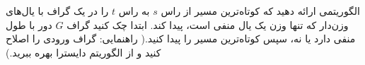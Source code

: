 الگوریتمی ارائه دهید که کوتاه‌ترین مسیر از راس $s$ به راس $t$ را در یک گراف با یال‌های وزن‌دار که تنها وزن یک یال منفی است، پیدا کند. ابتدا چک کنید گراف $G$ دور با طول منفی دارد یا نه، سپس کوتاه‌ترین مسیر را پیدا کنید.( راهنمایی: گراف ورودی را اصلاح کنید و از الگوریتم دایسترا بهره ببرید.) 